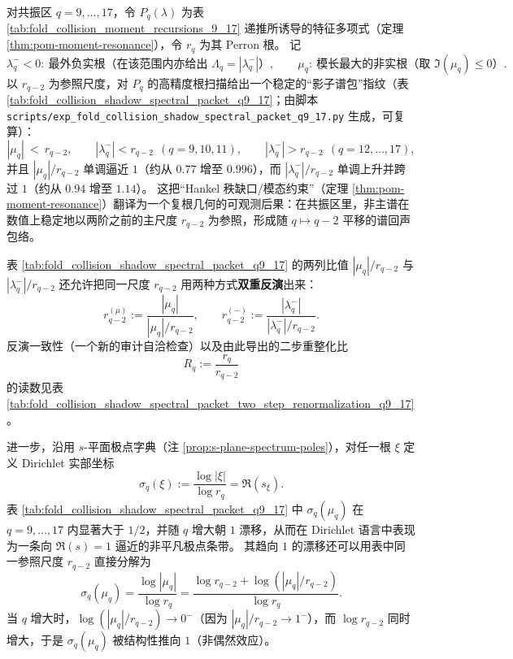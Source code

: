 \begin{remark}\label{rem:pom-shadow-spectral-packet-q9-17}
对共振区 \(q=9,\dots,17\)，令 \(P_q(\lambda)\) 为表 \ref{tab:fold_collision_moment_recursions_9_17} 递推所诱导的特征多项式（定理 \ref{thm:pom-moment-resonance}），令 \(r_q\) 为其 Perron 根。
记
\[
\lambda_q^-<0:\ \text{最外负实根（在该范围内亦给出 }\Lambda_q=|\lambda_q^-|\text{）},
\qquad
\mu_q:\ \text{模长最大的非实根（取 }\Im(\mu_q)\le 0\text{）}.
\]
以 \(r_{q-2}\) 为参照尺度，对 \(P_q\) 的高精度根扫描给出一个稳定的“影子谱包”指纹（表 \ref{tab:fold_collision_shadow_spectral_packet_q9_17}；由脚本 \texttt{scripts/exp\_fold\_collision\_shadow\_spectral\_packet\_q9\_17.py} 生成，可复算）：
\[
|\mu_q|\ <\ r_{q-2},
\qquad
|\lambda_q^-|<r_{q-2}\ \ (q=9,10,11),
\qquad
|\lambda_q^-|>r_{q-2}\ \ (q=12,\dots,17),
\]
并且 \(|\mu_q|/r_{q-2}\) 单调逼近 \(1\)（约从 \(0.77\) 增至 \(0.996\)），而 \(|\lambda_q^-|/r_{q-2}\) 单调上升并跨过 \(1\)（约从 \(0.94\) 增至 \(1.14\)）。
这把“Hankel 秩缺口/模态约束”（定理 \ref{thm:pom-moment-resonance}）翻译为一个复根几何的可观测后果：在共振区里，非主谱在数值上稳定地以两阶之前的主尺度 \(r_{q-2}\) 为参照，形成随 \(q\mapsto q-2\) 平移的谱回声包络。
\par
表 \ref{tab:fold_collision_shadow_spectral_packet_q9_17} 的两列比值
\(
|\mu_q|/r_{q-2}
\)
与
\(
|\lambda_q^-|/r_{q-2}
\)
还允许把同一尺度 \(r_{q-2}\) 用两种方式\textbf{双重反演}出来：
\[
r_{q-2}^{(\mu)}:=\frac{|\mu_q|}{|\mu_q|/r_{q-2}},
\qquad
r_{q-2}^{(-)}:=\frac{|\lambda_q^-|}{|\lambda_q^-|/r_{q-2}}.
\]
反演一致性（一个新的审计自洽检查）以及由此导出的二步重整化比
\[
\boxed{\ R_q:=\frac{r_q}{r_{q-2}}\ }
\]
的读数见表 \ref{tab:fold_collision_shadow_spectral_packet_two_step_renormalization_q9_17}。
\par
进一步，沿用 \(s\)-平面极点字典（注 \ref{prop:s-plane-spectrum-poles}），对任一根 \(\xi\) 定义 Dirichlet 实部坐标
\[
\sigma_q(\xi):=\frac{\log|\xi|}{\log r_q}=\Re(s_\xi).
\]
表 \ref{tab:fold_collision_shadow_spectral_packet_q9_17} 中 \(\sigma_q(\mu_q)\) 在 \(q=9,\dots,17\) 内显著大于 \(1/2\)，并随 \(q\) 增大朝 \(1\) 漂移，从而在 Dirichlet 语言中表现为一条向 \(\Re(s)=1\) 逼近的非平凡极点条带。
其趋向 \(1\) 的漂移还可以用表中同一参照尺度 \(r_{q-2}\) 直接分解为
\[
\sigma_q(\mu_q)=\frac{\log|\mu_q|}{\log r_q}
=\frac{\log r_{q-2}+\log(|\mu_q|/r_{q-2})}{\log r_q}.
\]
当 \(q\) 增大时，\(\log(|\mu_q|/r_{q-2})\to 0^{-}\)（因为 \(|\mu_q|/r_{q-2}\to 1^{-}\)），而 \(\log r_{q-2}\) 同时增大，于是 \(\sigma_q(\mu_q)\) 被结构性推向 \(1\)（非偶然效应）。

\end{remark}

